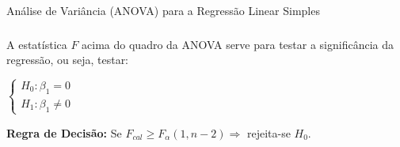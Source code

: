 \documentclass[14pt,aspectratio=1610]{beamer}
\begin{document}
\begin{frame}{Análise de Variância (ANOVA) para a Regressão Linear Simples}
\frametitle{}
\begin{block}{}
A estatística $F$ acima do quadro da ANOVA serve para testar a significância da regressão, ou seja, testar:
\begin{center}
$
\begin{cases}
       H_{0}:\beta_{1}=0\\ 
       H_{1}:\beta_{1}\neq 0
\end{cases}
$
\end{center}
\textbf{Regra de Decisão:} Se $F_{cal}\geq F_{\alpha}(1,n-2)\Rightarrow$ rejeita-se $H_{0}.$
\end{block}
\end{frame}
\end{document}
